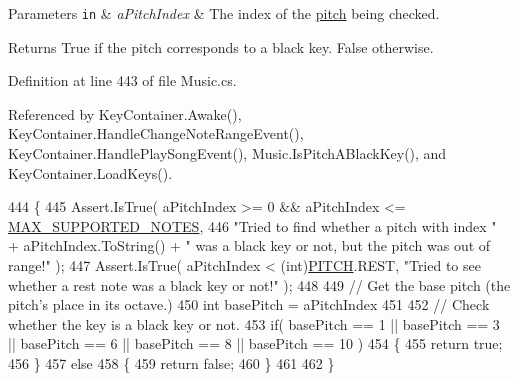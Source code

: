 \begin{DoxyParams}[1]{Parameters}
\mbox{\tt in}  & {\em a\+Pitch\+Index} & The index of the \hyperlink{group___music_enums_ga508f69b199ea518f935486c990edac1d}{pitch} being checked. \\
\hline
\end{DoxyParams}
\begin{DoxyReturn}{Returns}
True if the pitch corresponds to a black key. False otherwise. 
\end{DoxyReturn}


Definition at line 443 of file Music.\+cs.



Referenced by Key\+Container.\+Awake(), Key\+Container.\+Handle\+Change\+Note\+Range\+Event(), Key\+Container.\+Handle\+Play\+Song\+Event(), Music.\+Is\+Pitch\+A\+Black\+Key(), and Key\+Container.\+Load\+Keys().


\begin{DoxyCode}
444     \{
445         Assert.IsTrue( aPitchIndex >= 0 && aPitchIndex <= \hyperlink{group___music_constants_gaaf07da909a12e9fec0e43b70864f27b7}{MAX\_SUPPORTED\_NOTES}, 
446             \textcolor{stringliteral}{"Tried to find whether a pitch with index "} + aPitchIndex.ToString() + \textcolor{stringliteral}{" was a black key or
       not, but the pitch was out of range!"} );
447         Assert.IsTrue( aPitchIndex < (\textcolor{keywordtype}{int})\hyperlink{group___music_enums_ga508f69b199ea518f935486c990edac1d}{PITCH}.REST, \textcolor{stringliteral}{"Tried to see whether a rest note was a black
       key or not!"} );
448 
449         \textcolor{comment}{// Get the base pitch (the pitch's place in its octave.)}
450         \textcolor{keywordtype}{int} basePitch = aPitchIndex %
451 
452         \textcolor{comment}{// Check whether the key is a black key or not.}
453         \textcolor{keywordflow}{if}( basePitch == 1 || basePitch == 3 || basePitch == 6 || basePitch == 8 || basePitch == 10 )
454         \{
455             \textcolor{keywordflow}{return} \textcolor{keyword}{true};
456         \}
457         \textcolor{keywordflow}{else}
458         \{
459             \textcolor{keywordflow}{return} \textcolor{keyword}{false};
460         \}
461 
462     \}
\end{DoxyCode}
\mbox{\label{group___music_stat_func_ga4c91d4a78702a5c16e833af6585b9e19}} 
